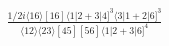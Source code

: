 \documentclass[varwidth, border=5pt]{standalone}
\begin{document}
\begin{my}
$\begin{gathered}
\scriptscriptstyle\frac{1/2i\langle16\rangle[16]\langle1|2+3|4]^3\langle3|1+2|6]^3}{\langle12\rangle\langle23\rangle[45][56]\langle1|2+3|6]^4}
\end{gathered}$
\end{my}
\end{document}
